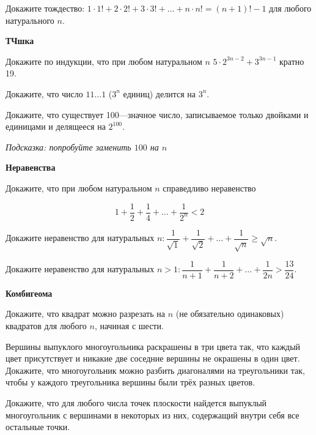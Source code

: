 \newpage

\centerline{\bf \Huge}



Докажите тождество: $1 \cdot 1!+2 \cdot 2!+3 \cdot 3!+\ldots+n \cdot n!=(n+1)!-1$ для любого натурального $n$.

\centerline{\bf \large ТЧшка}

Докажите по индукции, что при любом натуральном $n$ $5 \cdot 2^{3 n-2}+3^{3 n-1}$ кратно 19.

Докажите, что число $11 \ldots 1$ ($3^n$ единиц) делится на $3^n$.

Докажите, что существует 100---значное число, записываемое только двойками и единицами и делящееся на $2^{100}$.

\begin{flushright}
    \vspace{-3mm}
    \textit{\scriptsize Подсказка: попробуйте заменить $100$ на $n$}
\end{flushright}

\centerline{\bf \large Неравенства}

Докажите, что при любом натуральном $n$ справедливо неравенство

$$
1+\dfrac{1}{2}+\dfrac{1}{4}+\ldots+\dfrac{1}{2^n}<2
$$

Докажите неравенство для натуральных $n: \dfrac{1}{\sqrt{1}}+\dfrac{1}{\sqrt{2}}+\ldots+\dfrac{1}{\sqrt{n}} \geqslant \sqrt{n}$.

Докажите неравенство для натуральных $n>1: \dfrac{1}{n+1}+\dfrac{1}{n+2}+\ldots+\dfrac{1}{2 n}>\dfrac{13}{24}$.

\centerline{\bf \Huge}


\centerline{\bf \large Комбигеома}

Докажите, что квадрат можно разрезать на $n$ (не обязательно одинаковых) квадратов для любого $n$, начиная с шести.

Вершины выпуклого многоугольника раскрашены в три цвета так, что каждый цвет присутствует и никакие две соседние вершины не окрашены в один цвет. Докажите, что многоугольник можно разбить диагоналями на треугольники так, чтобы у каждого треугольника вершины были трёх разных цветов.

Докажите, что для любого числа точек плоскости найдется выпуклый многоугольник с вершинами в некоторых из них, содержащий внутри себя все остальные точки.
